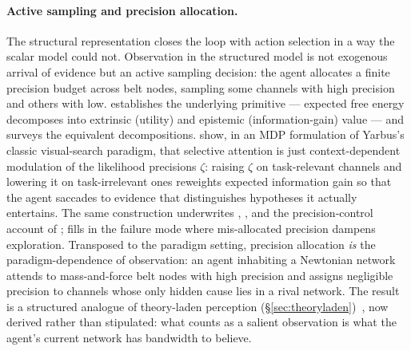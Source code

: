 \paragraph{Active sampling and precision allocation.}
The structural representation closes the loop with action selection in
a way the scalar model could not. Observation in the structured model
is not exogenous arrival of evidence but an active sampling decision:
the agent allocates a finite precision budget across belt nodes,
sampling some channels with high precision and others with low.
\citet{friston2015ActiveInferenceEpistemic} establishes the
underlying primitive --- expected free energy decomposes into
extrinsic (utility) and epistemic (information-gain) value ---
and \citet{millidge2021EFE} surveys the equivalent decompositions.
\citet{Mirza2019_2} show, in an MDP formulation of Yarbus's classic
visual-search paradigm, that selective attention is just
context-dependent modulation of the likelihood precisions $\zeta$:
raising $\zeta$ on task-relevant channels and lowering it on
task-irrelevant ones reweights expected information gain so that the
agent saccades to evidence that distinguishes hypotheses it actually
entertains. The same construction underwrites
\citet{feldmanFriston2010Attention}, \citet{parrFriston2017Attention},
and the precision-control account of
\citet{parrFriston2019AdvancedAtt}; \citet{limanowskiFriston2018Dark}
fills in the failure mode where mis-allocated precision dampens
exploration. Transposed to the paradigm setting, precision allocation
\emph{is} the paradigm-dependence of observation: an agent inhabiting
a Newtonian network attends to mass-and-force belt nodes with high
precision and assigns negligible precision to channels whose only
hidden cause lies in a rival network. The result is a structured
analogue of theory-laden perception
(\S\ref{sec:theoryladen})~\citep{hylandAlbarracin2025MindChange},
now derived rather than stipulated: what counts as a salient
observation is what the agent's current network has bandwidth to
believe.
